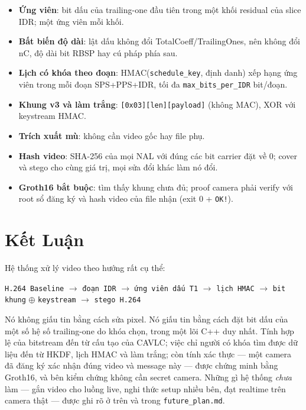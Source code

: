 \documentclass[11pt,a4paper]{article}
\begin{document}
\begin{itemize}[leftmargin=*]
  \item \textbf{Ứng viên}: bit dấu của trailing-one đầu tiên trong một khối residual
  của slice IDR; một ứng viên mỗi khối.
  \item \textbf{Bất biến độ dài}: lật dấu không đổi TotalCoeff/TrailingOnes, nên không
  đổi nC, độ dài bit RBSP hay cú pháp phía sau.
  \item \textbf{Lịch có khóa theo đoạn}: HMAC(\texttt{schedule\_key}, định danh) xếp
  hạng ứng viên trong mỗi đoạn SPS+PPS+IDR, tối đa \texttt{max\_bits\_per\_IDR} bit/đoạn.
  \item \textbf{Khung v3 và làm trắng}: \texttt{[0x03][len][payload]} (không MAC),
  XOR với keystream HMAC.
  \item \textbf{Trích xuất mù}: không cần video gốc hay file phụ.
  \item \textbf{Hash video}: SHA-256 của mọi NAL với đúng các bit carrier đặt về 0;
  cover và stego cho cùng giá trị, mọi sửa đổi khác làm nó đổi.
  \item \textbf{Groth16 bắt buộc}: tìm thấy khung chưa đủ; proof camera phải verify với
  root sổ đăng ký và hash video của file nhận (exit 0 + \texttt{OK!}).
\end{itemize}

\section{Kết Luận}

Hệ thống xử lý video theo hướng rất cụ thể:

\begin{center}
\texttt{H.264 Baseline}
\(\rightarrow\)
\texttt{đoạn IDR}
\(\rightarrow\)
\texttt{ứng viên dấu T1}
\(\rightarrow\)
\texttt{lịch HMAC}
\(\rightarrow\)
\texttt{bit khung} \(\oplus\) \texttt{keystream}
\(\rightarrow\)
\texttt{stego H.264}
\end{center}

Nó không giấu tin bằng cách sửa pixel. Nó giấu tin bằng cách đặt bit dấu của một số
hệ số trailing-one do khóa chọn, trong một lõi C++ duy nhất. Tính hợp lệ của
bitstream đến từ cấu tạo của CAVLC; việc chỉ người có khóa tìm được dữ liệu đến từ
HKDF, lịch HMAC và làm trắng; còn tính xác thực --- một camera đã đăng ký xác nhận đúng
video và message này --- được chứng minh bằng Groth16, và bên kiểm chứng không cần
secret camera. Những gì hệ thống \emph{chưa} làm --- gắn video cho luồng live, nghi thức
setup nhiều bên, đạt realtime trên camera thật --- được ghi rõ ở trên và trong
\texttt{future\_plan.md}.
\end{document}

